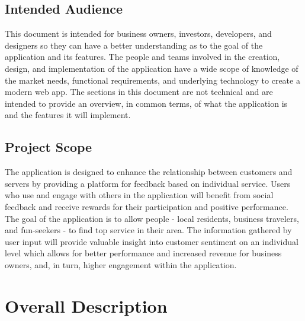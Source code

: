 \documentclass{scrreprt}
\begin{document}
\section{Intended Audience}
This document is intended for business owners, investors, developers, and designers so they can have a better understanding as to the goal of the application and its features. The people and teams involved in the creation, design, and implementation of the application have a wide scope of knowledge of the market needs, functional requirements, and underlying technology to create a modern web app. The sections in this document are not technical and are intended to provide an overview, in common terms, of what the application is and the features it will implement.

\section{Project Scope}
The application is designed to enhance the relationship between customers and servers by providing a platform for feedback based on individual service. Users who use and engage with others in the application will benefit from social feedback and receive rewards for their participation and positive performance. The goal of the application is to allow people - local residents, business travelers, and fun-seekers - to find top service in their area. The information gathered by user input will provide valuable insight into customer sentiment on an individual level which allows for better performance and increased revenue for business owners, and, in turn, higher engagement within the application.

\chapter{Overall Description}

\end{document}
